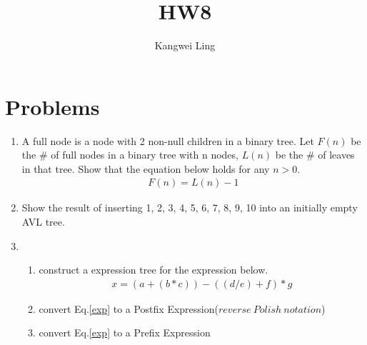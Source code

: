 \documentclass[a4papter]{article}
\title{\textbf{HW8}}
\author{Kangwei Ling}
\begin{document}
\maketitle
\section{Problems}
\begin{enumerate}
	\item A full node is a node with 2 non-null children in a binary tree. Let $F(n)$ be the \# of full nodes in a binary tree with n nodes, $L(n)$ be the \# of leaves in that tree. Show that the equation below holds for any $n > 0$.
	\begin{align*}
			F(n) = L(n) - 1
	\end{align*}
	
	\item Show the result of inserting 1, 2, 3, 4, 5, 6, 7, 8, 9, 10 into an initially empty AVL tree.

	\item 
	\begin{enumerate}
		\item 
				construct a expression tree for the expression below.
			\begin{align} \label{exp}
			x = (a + (b * c)) - ((d / e) + f)*g
			\end{align}
		\item convert Eq.\eqref{exp} to a Postfix Expression($reverse \ Polish \ notation$)
		\item convert Eq.\eqref{exp} to a Prefix Expression
			\end{enumerate}
\end{enumerate}
\end{document}
